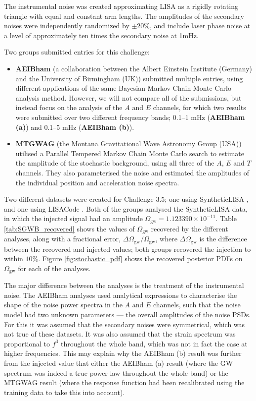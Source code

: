 \documentclass{iopart}
\begin{document}
The instrumental noise was created approximating LISA as a rigidly rotating
triangle with equal and constant arm lengths.
The amplitudes of the 
secondary noises were independently randomized  by $\pm 20\%$,
and include laser phase noise at a level of approximately ten times the secondary 
noise at 1mHz.

Two groups submitted entries for this challenge:
\begin{itemize}
\item \textbf{AEIBham} (a collaboration between the Albert Einstein Institute
(Germany) and the University of Birmingham (UK)) submitted multiple entries,
using different applications of the same Bayesian Markov Chain Monte Carlo
analysis method. However, we will not compare all of the submissions, but
instead focus on the analysis of the $A$ and $E$ channels, for which two results were submitted
over two different frequency bands; 0.1--1 mHz (\textbf{AEIBham (a)})
and 0.1--5 mHz (\textbf{AEIBham (b)}).
\item \textbf{MTGWAG} (the Montana Gravitational Wave Astronomy Group (USA)) 
utilised a Parallel Tempered Markov Chain Monte Carlo search to
estimate the amplitude of the stochastic background, using all three of the 
$A$, $E$ and $T$ channels. They also parameterised
the noise and estimated the amplitudes of the individual position and 
acceleration noise spectra.
\end{itemize}

Two different datasets were created for Challenge 3.5; one using 
SyntheticLISA \cite{}, and one using LISACode \cite{}. Both of the groups 
analysed the SyntheticLISA data, in which the injected signal had
an amplitude
$\Omega_{\mathrm{gw}}=1.123390\times 10^{-11}$. Table \ref{tab:SGWB_recovered}
shows the values of $\Omega_{\mathrm{gw}}$ recovered by the different
analyses, along with a fractional error, 
$\Delta \Omega_{\mathrm{gw}}/\Omega_{\mathrm{gw}}$,
where $\Delta \Omega_{\mathrm{gw}}$ is the difference between the recovered
and injected values; both groups recovered the injection
to within $10\%$. 
Figure \ref{fig:stochastic_pdf} shows the recovered posterior PDFs on 
$\Omega_{\mathrm{gw}}$ for each of the analyses. 

The major difference between the analyses is the treatment of the instrumental
noise. 
The AEIBham analyses 
used analytical expressions to characterise the shape of the noise power spectra
in the $A$ and $E$ channels, such that the noise model had two unknown parameters ---
the overall amplitudes of the noise PSDs.
For this it was assumed that the secondary noises were symmetrical,
which was not true of these datasets. It was also assumed that the strain spectrum was
proportional to $f^3$ throughout the whole band, which was not in fact the case at higher frequencies. This
may explain why the AEIBham (b) result was further from the injected
value that either the AEIBham (a) result (where the GW spectrum was indeed
a true power law throughout the whole band) or the MTGWAG result (where the 
response function had been recalibrated using the training data to take 
this into account).
\end{document}

